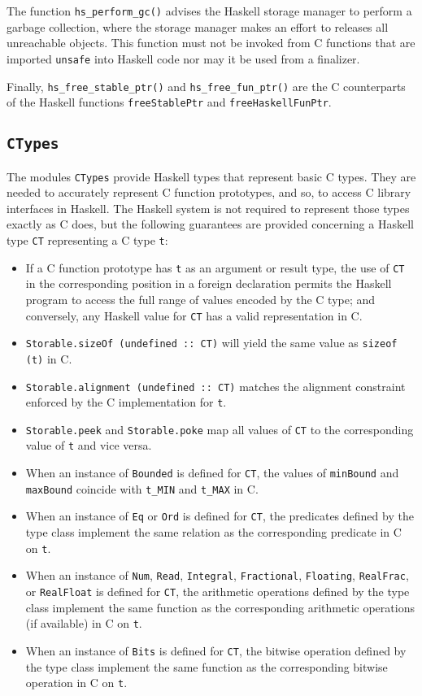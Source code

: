 \documentclass[a4paper,twoside]{article}
\newcommand{\code}[1]{\texttt{#1}}      %
\begin{document}
The function \code{hs\_perform\_gc()} advises the Haskell storage manager to
perform a garbage collection, where the storage manager makes an effort to
releases all unreachable objects.  This function must not be invoked from C
functions that are imported \code{unsafe} into Haskell code nor may it be used
from a finalizer.

Finally, \code{hs\_free\_stable\_ptr()} and \code{hs\_free\_fun\_ptr()} are
the C counterparts of the Haskell functions \code{freeStablePtr} and
\code{freeHaskellFunPtr}.

\subsection{\code{CTypes}}
\label{sec:CTypes}

The modules \code{CTypes} provide Haskell types that represent basic C types.
They are needed to accurately represent C function prototypes, and so, to
access C library interfaces in Haskell.  The Haskell system is not required to
represent those types exactly as C does, but the following guarantees are
provided concerning a Haskell type \code{CT} representing a C type \code{t}:
%
\begin{itemize}
\item If a C function prototype has \code{t} as an argument or result type,
  the use of \code{CT} in the corresponding position in a foreign declaration
  permits the Haskell program to access the full range of values encoded by
  the C type; and conversely, any Haskell value for \code{CT} has a valid
  representation in C.
\item \code{Storable.sizeOf (undefined ::\ CT)} will yield the same value as
  \code{sizeof (t)} in C.
\item \code{Storable.alignment (undefined ::\ CT)} matches the alignment
  constraint enforced by the C implementation for \code{t}.
\item \code{Storable.peek} and \code{Storable.poke} map all values of
  \code{CT} to the corresponding value of \code{t} and vice versa.
\item When an instance of \code{Bounded} is defined for \code{CT}, the values
  of \code{minBound} and \code{maxBound} coincide with \code{t\_MIN} and
  \code{t\_MAX} in C.
\item When an instance of \code{Eq} or \code{Ord} is defined for \code{CT},
  the predicates defined by the type class implement the same relation as the
  corresponding predicate in C on \code{t}.
\item When an instance of \code{Num}, \code{Read}, \code{Integral},
  \code{Fractional}, \code{Floating}, \code{RealFrac}, or \code{RealFloat} is
  defined for \code{CT}, the arithmetic operations defined by the type class
  implement the same function as the corresponding arithmetic operations (if
  available) in C on \code{t}.
\item When an instance of \code{Bits} is defined for \code{CT}, the bitwise
  operation defined by the type class implement the same function as the
  corresponding bitwise operation in C on \code{t}.
\end{itemize}
\end{document}

